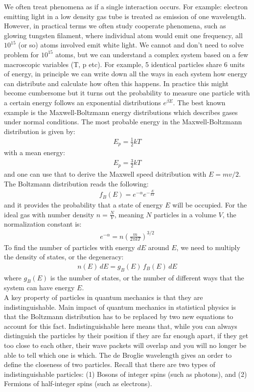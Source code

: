 \documentclass[11pt]{article}
\theoremstyle{break}
\theoremstyle{break}
\begin{document}
We often treat phenomena as if a single interaction occurs. For example: electron emitting light in a low density gas tube is treated as emission of one wavelength. However, in practical terms we often study cooperate phenomena, such as glowing tungsten filament, where individual atom would emit one frequency, all $10^{15}$ (or so) atoms involved emit white light. We cannot and don’t need 
to solve problem for $10^{15}$ atoms, but we can understand a complex 
system based on a few macroscopic variables (T, p etc). For example, 5 identical particles share 6 units of energy, in principle we can write down all the ways in each system how 
energy can distribute and calculate how often this happens. In practice this might become cumbersome but it turns out the probability to measure one particle with a certain energy follows an exponential distributions $e^{\beta E}$. The best known example is the Maxwell-Boltzmann energy  
distributions which describes gases under normal conditions. The most probable energy in the Maxwell-Boltzmann distribution is given by:
\begin{align*}
E_p = \frac{1}{2}kT
\end{align*}
with a mean energy:
\begin{align*}
E_p = \frac{3}{2}kT
\end{align*}
and one can use that to derive the Maxwell speed dsitribution with $E =mv/2$.\\

The Boltzmann distribution reads the following:
\begin{align*}
f_B(E) = e^{-\alpha}e^{-\frac{E}{kT}}
\end{align*}
and it provides the probability that a state of energy $E$ will be occupied. For the ideal gas with number density $n=\frac{N}{V}$, meaning $N$ particles in a volume $V$, the normalization constant is:
\begin{align*}
e^{-\alpha} = n\left( \frac{m}{2\pi kT}\right)^{3/2}
\end{align*}
To find the number of particles with energy $d E$ around $E$, we need to multiply the density of states, or the degeneracy:
\begin{align*}
n(E) \, dE = g_B(E)\, f_B(E) \, dE
\end{align*}
where $g_B(E)$ is the number of states, or the number of different ways that the system can have energy $E$.\\

A key property of particles in quantum mechanics is that they are 
indistinguishable. Main impact of quantum mechanics in statistical physics is that the Boltzmann distribution has to be replaced by two new equations to account for this fact. Indistinguishable here means that, while you can always distinguish the particles by their position if they are far enough apart, if they get too close to each other, their wave packets will overlap and you will no longer be able to tell which one is which. The de Broglie wavelength gives an order to define the closeness of two particles. Recall that there are two types of indistinguishable particles: (1) Bosons of integer spins (such as photons), and (2) Fermions of half-integer spins (such as electrons).\\
\end{document}
